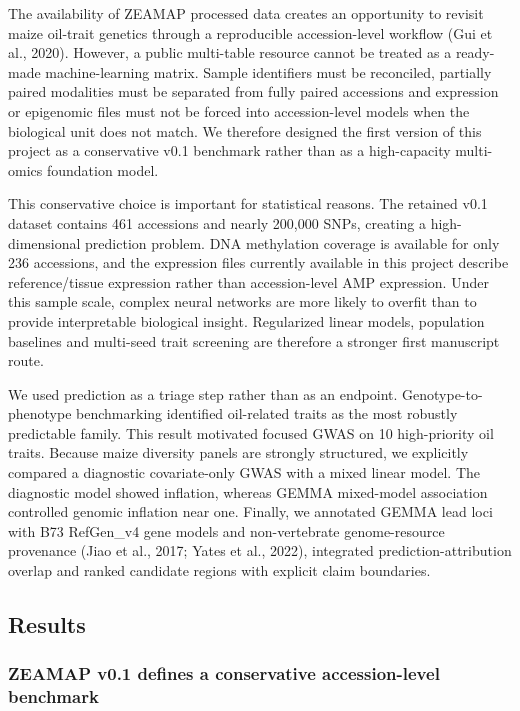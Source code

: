 \documentclass[
]{article}
\begin{document}
The availability of ZEAMAP processed data creates an opportunity to
revisit maize oil-trait genetics through a reproducible accession-level
workflow (Gui et al., 2020). However, a public multi-table resource
cannot be treated as a ready-made machine-learning matrix. Sample
identifiers must be reconciled, partially paired modalities must be
separated from fully paired accessions and expression or epigenomic
files must not be forced into accession-level models when the biological
unit does not match. We therefore designed the first version of this
project as a conservative v0.1 benchmark rather than as a high-capacity
multi-omics foundation model.

This conservative choice is important for statistical reasons. The
retained v0.1 dataset contains 461 accessions and nearly 200,000 SNPs,
creating a high-dimensional prediction problem. DNA methylation coverage
is available for only 236 accessions, and the expression files currently
available in this project describe reference/tissue expression rather
than accession-level AMP expression. Under this sample scale, complex
neural networks are more likely to overfit than to provide interpretable
biological insight. Regularized linear models, population baselines and
multi-seed trait screening are therefore a stronger first manuscript
route.

We used prediction as a triage step rather than as an endpoint.
Genotype-to-phenotype benchmarking identified oil-related traits as the
most robustly predictable family. This result motivated focused GWAS on
10 high-priority oil traits. Because maize diversity panels are strongly
structured, we explicitly compared a diagnostic covariate-only GWAS with
a mixed linear model. The diagnostic model showed inflation, whereas
GEMMA mixed-model association controlled genomic inflation near one.
Finally, we annotated GEMMA lead loci with B73 RefGen\_v4 gene models
and non-vertebrate genome-resource provenance (Jiao et al., 2017; Yates
et al., 2022), integrated prediction-attribution overlap and ranked
candidate regions with explicit claim boundaries.

\subsection{Results}\label{results}

\subsubsection{ZEAMAP v0.1 defines a conservative accession-level
benchmark}\label{zeamap-v0.1-defines-a-conservative-accession-level-benchmark}
\end{document}
